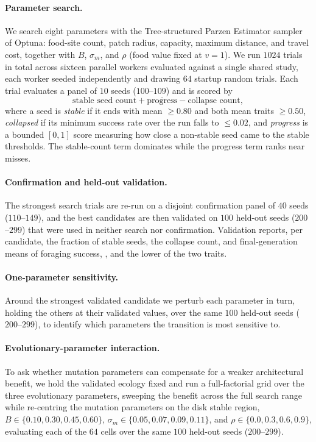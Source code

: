 \paragraph{Parameter search.}
We search eight parameters with the Tree-structured Parzen Estimator sampler of
Optuna: food-site count, patch radius, capacity, maximum distance, and travel
cost, together with $B$, $\sigma_m$, and $\rho$ (food value fixed at $v = 1$). We
run $1024$ trials in total across sixteen parallel workers evaluated against a
single shared study, each worker seeded independently and drawing $64$ startup
random trials. Each trial evaluates a panel of $10$ seeds ($100$--$109$) and is
scored by
\begin{equation}
  \text{stable seed count} + \overline{\text{progress}} - \text{collapse count},
\end{equation}
where a seed is \emph{stable} if it ends with mean  $\ge 0.80$ and both
mean  traits $\ge 0.50$, \emph{collapsed} if its minimum
success rate over the run falls to $\le 0.02$, and \emph{progress} is a bounded
$[0,1]$ score measuring how close a non-stable seed came to the stable thresholds.
The stable-count term dominates while the progress term ranks near misses.

\paragraph{Confirmation and held-out validation.}
The strongest search trials are re-run on a disjoint confirmation panel of $40$
seeds ($110$--$149$), and the best candidates are then validated on $100$
held-out seeds ($200$--$299$) that were used in neither search nor confirmation.
Validation reports, per candidate, the fraction of stable seeds, the collapse
count, and final-generation means of foraging success, , and the lower of
the two  traits.

\paragraph{One-parameter sensitivity.}
Around the strongest validated candidate we perturb each parameter in turn,
holding the others at their validated values, over the same $100$ held-out seeds
($200$--$299$), to identify which parameters the transition is most sensitive to.

\paragraph{Evolutionary-parameter interaction.}
To ask whether mutation parameters can compensate for a weaker architectural
benefit, we hold the validated ecology fixed and run a full-factorial grid over
the three evolutionary parameters, sweeping the benefit across the full search
range while re-centring the mutation parameters on the disk stable region,
$B \in \{0.10, 0.30, 0.45, 0.60\}$, $\sigma_m \in \{0.05, 0.07, 0.09, 0.11\}$, and
$\rho \in \{0.0, 0.3, 0.6, 0.9\}$, evaluating each of the $64$ cells over the same
$100$ held-out seeds ($200$--$299$).

